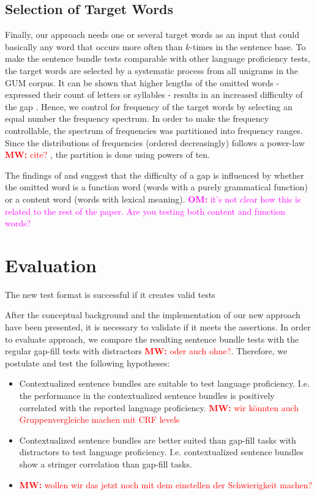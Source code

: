 \documentclass[11pt,letterpaper]{article}
\newcommand{\mw}[1]{\textcolor{red}{\textbf{MW:} #1}}
\newcommand{\om}[1]{\textcolor{magenta}{\textbf{OM:} #1}}
\newcommand{\mw}[1]{}
\newcommand{\om}[1]{}
\begin{document}
\subsection{Selection of Target Words}
Finally, our approach needs one or several target words as an input that could basically any word that occurs more often than $k$-times in the sentence base. To make the sentence bundle tests comparable with other language proficiency tests, the target words are selected by a systematic process from all unigrams in the GUM corpus. 
It can be shown that higher lengths of the omitted words - expressed their count of letters or syllables - results in an increased difficulty of the gap \cite{abraham1992meaning,brown1989cloze}. 
Hence, we control for frequency of the target words by selecting an equal number the frequency spectrum. 
In order to make the frequency controllable, the spectrum of frequencies was partitioned into frequency ranges. Since the distributions of frequencies (ordered decreasingly) follows a power-law \mw{cite?} , the partition is done using powers of ten. 

The findings of  and  suggest that the difficulty of a gap is influenced by whether the omitted word is a function word (words with a purely grammatical function) or a content word (words with lexical meaning).
\om{it's not clear how this is related to the rest of the paper. Are you testing both content and function words?}

\section{Evaluation}
\label{sec:evaluation}

The new test format is successful if it creates valid tests


After the conceptual background and the implementation of our new approach have been presented, it is necessary to validate if it meets the assertions. In order to evaluate approach, we compare the resulting sentence bundle tests with the regular gap-fill tests with distractors \mw{oder auch ohne?}. Therefore, we postulate and test the following hypotheses:
\begin{itemize}
  \item Contextualized sentence bundles are suitable to test language proficiency. I.e. the performance in the contextualized sentence bundles is positively correlated with the reported language proficiency. \mw{wir könnten auch Gruppenvergleiche machen mit CRF levels}
  \item Contextualized sentence bundles are better suited than gap-fill tasks with distractors to test language proficiency. I.e. contextualized sentence bundles show a stringer correlation than gap-fill tasks. 
  \item \mw{wollen wir das jetzt noch mit dem einstellen der Schwierigkeit machen?}
\end{itemize}
\end{document}
